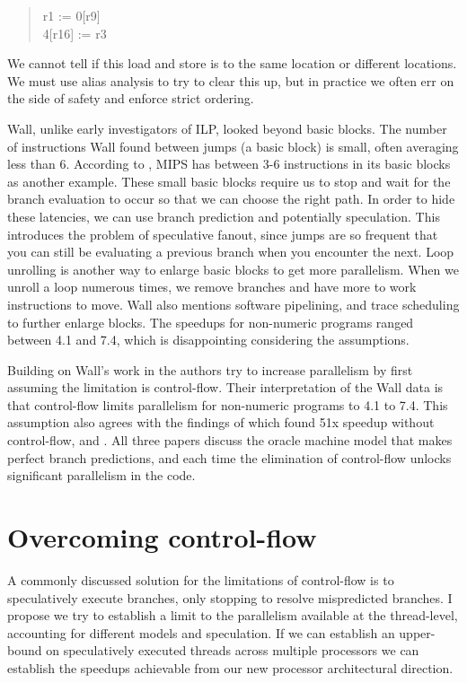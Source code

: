 \documentclass[12pt,twoside,letterpaper]{article}
\begin{document}
\begin{quote}
r1 := 0[r9] \\
4[r16] := r3
\end{quote}

We cannot tell if this load and store is to the same location or different locations. We must use alias analysis to try to clear this up, but in practice we often err on the side of safety and enforce strict ordering.

Wall, unlike early investigators of ILP, looked beyond basic blocks. The number of instructions Wall found between jumps (a basic block) is small, often averaging less than 6. According to \cite{Hennessy:2003p277}, MIPS has between 3-6 instructions in its basic blocks as another example. These small basic blocks require us to stop and wait for the branch evaluation to occur so that we can choose the right path. In order to hide these latencies, we can use branch prediction and potentially speculation. This introduces the problem of speculative fanout, since jumps are so frequent that you can still be evaluating a previous branch when you encounter the next. Loop unrolling is another way to enlarge basic blocks to get more parallelism. When we unroll a loop numerous times, we remove branches and have more to work instructions to move. Wall also mentions software pipelining, and trace scheduling to further enlarge blocks. The speedups for non-numeric programs ranged between 4.1 and 7.4, which is disappointing considering the assumptions.

Building on Wall's work in \cite{Lam:1992p188} the authors try to increase parallelism by first assuming the limitation is control-flow. Their interpretation of the Wall data is that control-flow limits parallelism for non-numeric programs to 4.1 to 7.4. This assumption also agrees with the findings of \cite{Riseman:1972p215} which found 51x speedup without control-flow, and \cite{Nicolau:1984p217}. All three papers discuss the oracle machine model that makes perfect branch predictions, and each time the elimination of control-flow unlocks significant parallelism in the code.

\section*{Overcoming control-flow}
A commonly discussed solution for the limitations of control-flow is to speculatively execute branches, only stopping to resolve mispredicted branches. I propose we try to establish a limit to the parallelism available at the thread-level, accounting for different models and speculation. If we can establish an upper-bound on speculatively executed threads across multiple processors we can establish the speedups achievable from our new processor architectural direction.
\end{document}
